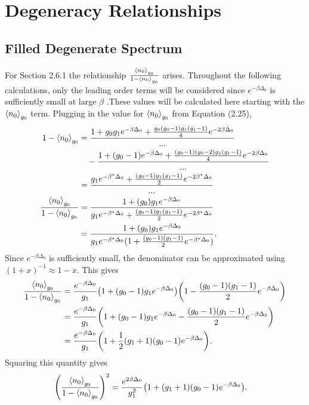 \chapter{Degeneracy Relationships}
\section{Filled Degenerate Spectrum}
For Section 2.6.1 the relationship $\frac{\left<{n_0}\right>_{g_0}}{1-\left<{n_0}\right>_{g_0}}$ arises. Throughout the following calculations, only the leading order terms will be considered since $e^{-\beta\Delta_0}$ is sufficiently small at large $\beta$ .These values will be calculated here starting with the $\left<{n_0}\right>_{g_0}$ term. Plugging in the value for $\left<{n_0}\right>_{g_0}$ from Equation (2.25),
\begin{align}
    1-\avg{n_0}_{g_0}&=\frac{1+g_0g_1e^{-\beta\Delta_0}+\frac{g_0(g_0-1)g_1(g_1-1)}{4}e^{-2\beta\Delta_0}}{...}\nonumber\\
    & \ \ \ -\frac{1+(g_0-1)e^{-\beta\Delta_0}+\frac{(g_0-1)(g_0-2)g_1(g_1-1)}{4} e^{-2\beta\Delta_0}}{...}\nonumber\\
    &=\frac{g_1e^{-\beta^*\Delta_0}+\frac{(g_0-1)g_1(g_1-1)}{2}e^{-2\beta^*\Delta_0}}{...}\\
    \frac{\avg{n_0}_{g_0}}{1-\avg{n_0}_{g_0}}&=\frac{1+(g_0)g_1 e^{-\beta\Delta_0}}{g_1e^{-\beta^*\Delta_0}+\frac{(g_0-1)g_1(g_1-1)}{2}e^{-2\beta^*\Delta_0}}\nonumber\\
    &=\frac{1+(g_0)g_1 e^{-\beta\Delta_0}}{g_1e^{-\beta^*\Delta_0}(1+\frac{(g_0-1)(g_1-1)}{2}e^{-\beta^*\Delta_0})}.
\end{align}
Since $e^{-\beta\Delta_0}$ is sufficiently small, the denominator can be approximated using $(1+x)^{-1}\approx 1-x$. This gives
\begin{align}
    \frac{\left<{n_0}\right>_{g_0}}{1-\left<{n_0}\right>_{g_0}}&=\frac{e^{-\beta\Delta_0}}{g_1}\qty(1+(g_0-1)g_1e^{-\beta\Delta_0})\qty(1-\frac{(g_0-1)(g_1-1)}{2}e^{-\beta\Delta_0})\nonumber\\
    &=\frac{e^{-\beta\Delta_0}}{g_1} \qty(1+(g_0-1)g_1e^{-\beta\Delta_0}-\frac{(g_0-1)(g_1-1)}{2}e^{-\beta\Delta_0})\nonumber\\
    &=\frac{e^{-\beta\Delta_0}}{g_1} \qty(1+\frac{1}{2}(g_1+1)(g_0-1) e^{-\beta\Delta_0}).
\end{align} 
Squaring this quantity gives
\begin{align}
    \qty(\frac{\left<{n_0}\right>_{g_0}}{1-\left<{n_0}\right>_{g_0}})^2&=\frac{e^{2\beta\Delta_0}}{g_1^2}\qty(1+(g_1+1)(g_0-1)e^{-\beta\Delta_0}).
\end{align}

